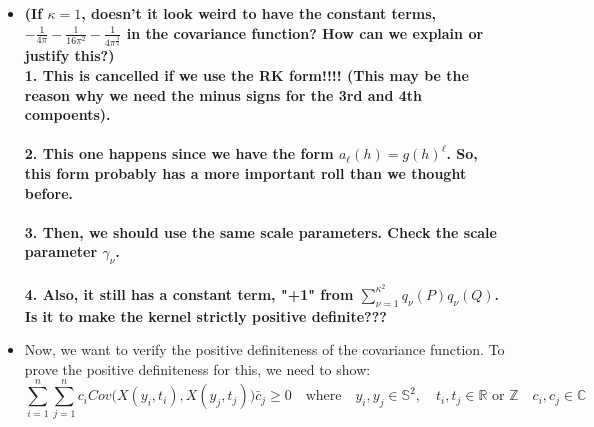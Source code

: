 \documentclass[11pt]{article}
\begin{document}
\begin{itemize}
\item
\textbf{{\color{red} (If $\kappa=1$, doesn't it look weird to have the constant terms, $-\frac{1}{4\pi} - \frac{1}{16\pi^2} - \frac{1}{4\pi^\frac{3}{2}}$ in the covariance function? How can we explain or justify this?)}}\\ 
\textbf{{\color{blue} 1. This is cancelled if we use the RK form!!!! (This may be the reason why we need the minus signs for the 3rd and 4th compoents).}}\\
\\
\textbf{{\color{blue} 2. This one happens since we have the form $a_\ell(h) = g(h)^\ell$. So, this form probably has a more important roll than we thought before.}}\\ 
\\
\textbf{{\color{blue} 3. Then, we should use the same scale parameters. Check the scale parameter $\gamma_\nu$.}}\\
\\
\textbf{{\color{blue} 4. Also, it still has a constant term, "+1" from $\sum_{\nu=1}^{\kappa^2}q_{\nu}(P) q_{\nu}(Q)$. Is it to make the kernel strictly positive definite???}}\\

\item
Now, we want to verify the positive definiteness of the covariance function. To prove the positive definiteness for this, we need to show:\\
$$\sum_{i=1}^n \sum_{j=1}^n c_i Cov\biggl(X(y_i,t_i), X(y_j,t_j)\biggl) \bar{c}_j  \ge 0 \quad \text{where} \quad y_i,y_j \in \mathbb{S}^2, \quad t_i,t_j \in \mathbb{R} \text{ or } \mathbb{Z} \quad c_i, c_j \in \mathbb{C}$$


\end{itemize}
\end{document}
